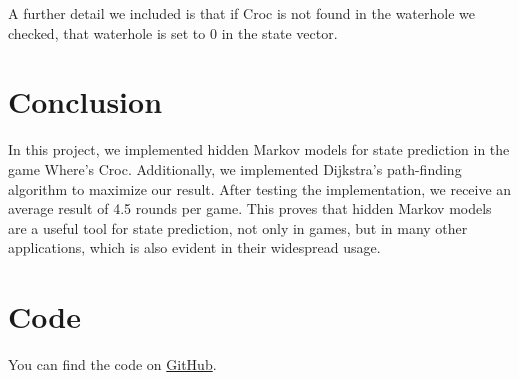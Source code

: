 \documentclass[a4paper]{article}
\begin{document}
A further detail we included is that if Croc is not found in the waterhole we checked, that waterhole is set to 0 in the state vector.

\section{Conclusion}
In this project, we implemented hidden Markov models for state prediction in the game Where's Croc. Additionally, we implemented Dijkstra's path-finding algorithm to maximize our result. After testing the implementation, we receive an average result of 4.5 rounds per game. This proves that hidden Markov models are a useful tool for state prediction, not only in games, but in many other applications, which is also evident in their widespread usage. 

\section{Code}
You can find the code on \href{https://github.com/m3x1m0m/Artificial-Intelligence-Course/}{GitHub}.


\end{document}
